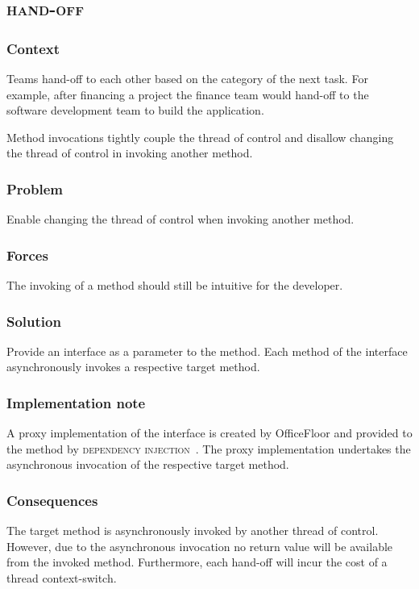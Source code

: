 \documentclass[prodmode]{style/acmlarge}
\begin{document}
\subsection{\textsc{\textbf{hand-off}}}

\subsubsection*{Context} Teams hand-off to each other based on the category of
the next task.  For example, after financing a project the finance team would
hand-off to the software development team to build the application.

Method invocations tightly couple the thread of control and disallow changing
the thread of control in invoking another method.

\subsubsection*{Problem} Enable changing the thread of control when invoking
another method.

\subsubsection*{Forces} The invoking of a method should still be intuitive for
the developer.

\subsubsection*{Solution}  Provide an interface as a parameter to the method.
Each method of the interface asynchronously invokes a respective target method.

\subsubsection*{Implementation note} A proxy implementation of the interface is
created by OfficeFloor and provided to the method by \textsc{dependency
injection}~\cite{ioc}.  The proxy implementation undertakes the asynchronous
invocation of the respective target method.

\subsubsection*{Consequences} The target method is asynchronously invoked by
another thread of control.  However, due to the asynchronous invocation no
return value will be available from the invoked method.  Furthermore, each
hand-off will incur the cost of a thread context-switch.
\end{document}
